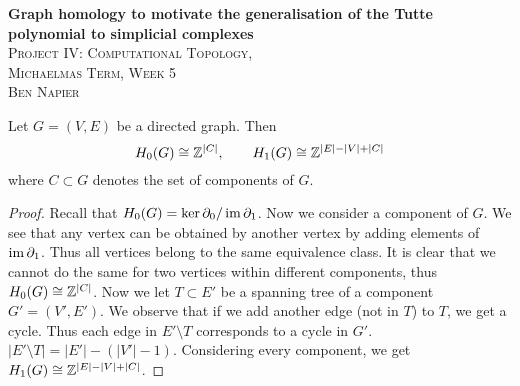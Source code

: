 

% 



\begin{center}
  \textbf{Graph homology to motivate the generalisation of the Tutte polynomial to simplicial complexes} \\
  \textsc{Project IV: Computational Topology, \\ Michaelmas Term, Week 5} \\
  \textsc{Ben Napier}
  \vspace{1em}
\end{center}

\begin{theorem}
  Let $G = (V,E)$ be a directed graph. Then
  \[ H_0(G) \cong \mathbb{Z}^{\lvert C \rvert}, \qquad H_1(G) \cong \mathbb{Z}^{\lvert E \rvert - \lvert V \rvert + \lvert C \rvert} \]
  where $C \subset G$ denotes the set of components of $G$.
\end{theorem}

\begin{proof}
  Recall that $H_0(G) = \ker \partial_0 / \operatorname*{im} \partial_1$. Now we consider a component of $G$. We see that any vertex can be obtained by another vertex by adding elements of $\operatorname*{im} \partial_1$. Thus all vertices belong to the same equivalence class. It is clear that we cannot do the same for two vertices within different components, thus $H_0(G) \cong \mathbb{Z}^{\lvert C \rvert}$. Now we let $T \subset E'$ be a spanning tree of a component $G' = (V', E')$. We observe that if we add another edge (not in $T$) to $T$, we get a cycle. Thus each edge in $E' \setminus T$ corresponds to a cycle in $G'$. $\lvert E' \setminus T \rvert = \lvert E' \rvert - (\lvert V' \rvert - 1)$. Considering every component, we get $H_1(G) \cong \mathbb{Z}^{\lvert E \rvert - \lvert V \rvert + \lvert C \rvert}$.
\end{proof}



